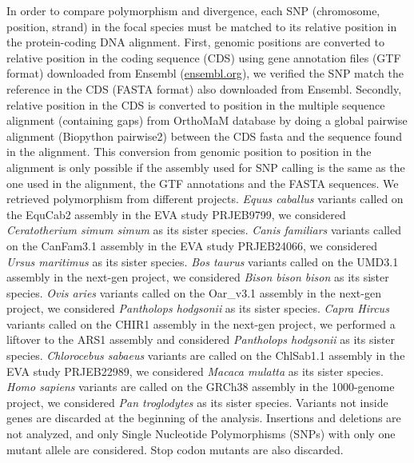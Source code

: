 \documentclass{article}
\begin{document}
    In order to compare polymorphism and divergence, each SNP (chromosome, position, strand) in the focal species must be matched to its relative position in the protein-coding DNA alignment.
    First, genomic positions are converted to relative position in the coding sequence (CDS) using gene annotation files (GTF format) downloaded from Ensembl (\url{ensembl.org}), we verified the SNP match the reference in the CDS (FASTA format) also downloaded from Ensembl.
    Secondly, relative position in the CDS is converted to position in the multiple sequence alignment (containing gaps) from OrthoMaM database\cite{ranwez_orthomam_2007, douzery_orthomam_2014, scornavacca_orthomam_2019} by doing a global pairwise alignment (Biopython pairwise2) between the CDS fasta and the sequence found in the alignment.
    This conversion from genomic position to position in the alignment is only possible if the assembly used for SNP calling is the same as the one used in the alignment, the GTF annotations and the FASTA sequences.
    We retrieved polymorphism from different projects.
    \textit{Equus caballus} variants called on the EquCab2 assembly in the EVA study PRJEB9799, we considered \textit{Ceratotherium simum simum} as its sister species.
    \textit{Canis familiars} variants called on the CanFam3.1 assembly in the EVA study PRJEB24066, we considered \textit{Ursus maritimus} as its sister species.
    \textit{Bos taurus} variants called on the UMD3.1 assembly in the next-gen project, we considered \textit{Bison bison bison} as its sister species.
    \textit{Ovis aries} variants called on the Oar\_v3.1 assembly in the next-gen project, we considered \textit{Pantholops hodgsonii} as its sister species.
    \textit{Capra Hircus} variants called on the CHIR1 assembly in the next-gen project, we performed a liftover to the ARS1 assembly and considered \textit{Pantholops hodgsonii} as its sister species.
    \textit{Chlorocebus sabaeus} variants are called on the ChlSab1.1 assembly in the EVA study PRJEB22989\cite{svardal_ancient_2017}, we considered \textit{Macaca mulatta} as its sister species.
    \textit{Homo sapiens} variants are called on the GRCh38 assembly in the 1000-genome project\cite{consortium_integrated_2012, the1000genomesprojectconsortium_global_2015}, we considered \textit{Pan troglodytes} as its sister species.
    Variants not inside genes are discarded at the beginning of the analysis.
    Insertions and deletions are not analyzed, and only Single Nucleotide Polymorphisms (SNPs) with only one mutant allele are considered.
    Stop codon mutants are also discarded.
\end{document}
